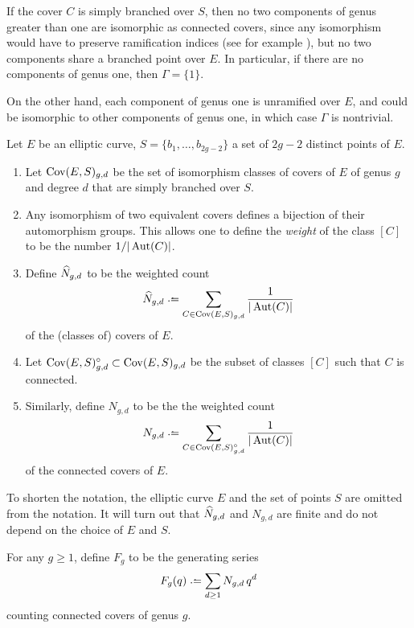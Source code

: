 \begin{rmk}
 If the cover $C$ is simply branched over $S$, then no two components of genus greater than one are isomorphic as connected covers, since any isomorphism would have to preserve ramification indices (see for example \cite[II, Prop. 2.6]{Silverman2009}), but no two components share a branched point over $E$. In particular, if there are no components of genus one, then $\Gamma=\{1\}$.
 
 On the other hand, each component of genus one is unramified over $E$, and could be isomorphic to other components of genus one, in which case $\Gamma$ is nontrivial.
\end{rmk}
\begin{defi} Let $E$ be an elliptic curve, $S=\{b_1,\dotsc,b_{2g-2}\}$ a set of $2g-2$ distinct points of $E$.
 \begin{enumerate}
  \item Let $\operatorname{Cov}(E,S)_{g,d}$ be the set of isomorphism classes of covers of $E$ of genus $g$ and degree $d$ that are simply branched over $S$.
  
  \item Any isomorphism of two equivalent covers defines a bijection of their automorphism groups. This allows one to define the \emph{weight} of the class $[C]$ to be the number $1/|\operatorname{Aut}(C)|$.
  
  \item Define $\widehat{N}_{g,d}$ to be the weighted count \[\what N_{g,d}\defeq\sum_{C\in \Cov(E,S)_{g,d}} \frac{1}{|\Aut(C)|}\] of the (classes of) covers of $E$.
  
  \item Let $\operatorname{Cov}(E,S)^{\circ}_{g,d}\subset\operatorname{Cov}(E,S)_{g,d}$ be the subset of classes $[C]$ such that $C$ is connected.
  
  \item Similarly, define $N_{g,d}$ to be the the weighted count \[N_{g,d}\defeq\sum_{C\in \Cov(E,S)^{\circ}_{g,d}} \frac{1}{\abs{\Aut(C)}}\] of the connected covers of $E$.
 \end{enumerate}
 To shorten the notation, the elliptic curve $E$ and the set of points $S$ are omitted from the notation. It will turn out that $\widehat{N}_{g,d}$ and $N_{g,d}$ are finite and do not depend on the choice of $E$ and $S$.
\end{defi}

\begin{defi}
 For any $g\geq 1$, define $F_g$ to be the generating series \[F_g(q)\defeq\sum_{d\geq 1}N_{g, d}\,q^d\] counting connected covers of genus $g$.
\end{defi}

